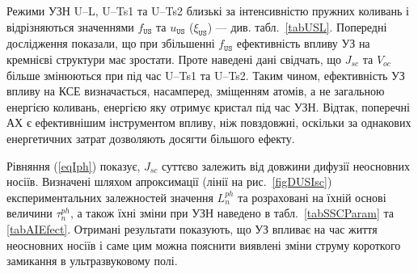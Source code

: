 Режими УЗН U--L, U--Ts1 та U--Ts2 близькі за інтенсивністю пружних коливань і відрізняються значеннями
$f_\mathtt{US}$ та $u_\mathtt{US}$ ($\xi_\mathtt{US}$) --- див. табл.~\ref{tabUSL}.
Попередні дослідження показали, що при збільшенні $f_\mathtt{US}$ ефективність впливу УЗ
на кремнієві структури має зростати.
Проте наведені дані свідчать, що $J_{sc}$ та $V_{oc}$ більше змінюються при під час U--Ts1 та U--Ts2.
Таким чином,
ефективність УЗ впливу на КСЕ визначається, насамперед, зміщенням атомів,
а не загальною енергією коливань, енергією яку отримує кристал під час УЗН.
Відтак, поперечні АХ є ефективнішим інструментом впливу, ніж повздовжні,
оскільки за однакових енергетичних затрат дозволяють досягти більшого ефекту.



Рівняння (\ref{eqIph}) показує, $J_{sc}$ суттєво залежить від довжини дифузії неосновних носіїв.
Визначені шляхом апроксимації (лінії на рис.~\ref{figDUSIsc})
експериментальних залежностей значення $L_n^{ph}$ та розраховані на їхній основі величини $\tau_n^{ph}$,
а також їхні зміни при УЗН наведено в табл.~\ref{tabSSCParam} та \ref{tabAIEfect}.
Отримані результати показують, що УЗ впливає на час життя неосновних носіїв і саме цим можна пояснити виявлені зміни струму короткого замикання в ультразвуковому полі.

